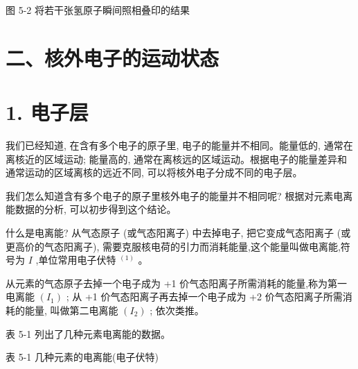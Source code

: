 \documentclass[10pt]{article}
\begin{document}
图 5-2 将若干张氢原子瞬间照相叠印的结果

\section*{二、核外电子的运动状态}

\section*{1. 电子层}

我们已经知道, 在含有多个电子的原子里, 电子的能量并不相同。能量低的, 通常在离核近的区域运动; 能量高的, 通常在离核远的区域运动。根据电子的能量差异和通常运动的区域离核的远近不同, 可以将核外电子分成不同的电子层。

我们怎么知道含有多个电子的原子里核外电子的能量并不相同呢? 根据对元素电离能数据的分析, 可以初步得到这个结论。

什么是电离能? 从气态原子 (或气态阳离子) 中去掉电子, 把它变成气态阳离子 (或更高价的气态阳离子), 需要克服核电荷的引力而消耗能量,这个能量叫做电离能,符号为 \(I\) ,单位常用电子伏特 \({}^{\left( 1\right) }\) 。

从元素的气态原子去掉一个电子成为 +1 价气态阳离子所需消耗的能量,称为第一电离能 \(\left( {I}_{1}\right)\) ; 从 +1 价气态阳离子再去掉一个电子成为 +2 价气态阳离子所需消耗的能量, 叫做第二电离能 \(\left( {I}_{2}\right)\) ; 依次类推。

表 5-1 列出了几种元素电离能的数据。

表 5-1 几种元素的电离能(电子伏特)

\begin{center}
\end{center}
\end{document}
